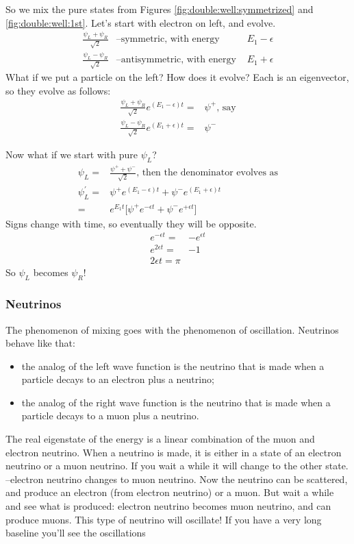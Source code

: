 \documentclass[]{article}
\begin{document}
So we mix the pure states from Figures \ref{fig:double:well:symmetrized} and \ref{fig:double:well:1st}. Let's start with electron on left, and evolve.
\begin{align*}
	\frac{\psi_L+\psi_R}{\sqrt{2}}& \text{--symmetric, with energy }& E_1-\epsilon\\
	\frac{\psi_L-\psi_R}{\sqrt{2}}& \text{--antisymmetric, with energy }& E_1+\epsilon
\end{align*}
What if we put a particle on the left? How does it evolve? Each is an eigenvector, so they evolve as follows:
\begin{align*}
	\frac{\psi_L+\psi_R}{\sqrt{2}} e^{(E_1-\epsilon)t}=&\psi^+ \text{, say}\\
	\frac{\psi_L-\psi_R}{\sqrt{2}}e^{(E_1+\epsilon)t}=&\psi^-
\end{align*}

Now what if we start with pure $\psi_L$?
\begin{align*}
	\psi_L =& \frac{\psi^+ + \psi^-}{\sqrt{2}}\text{, then the denominator evolves as}\\
	\psi_L^\prime =&\psi^+ e^{(E_1-\epsilon)t} + \psi^- e^{(E_1+\epsilon)t}\\
	=&e^{E_1 t}\big[\psi^+ e^{-\epsilon t} + \psi^- e^{+\epsilon t}\big]
\end{align*}
Signs change with time, so eventually they will be opposite.
\begin{align*}
	e^{-\epsilon t} =& - e^{\epsilon t}\\
	e^{2 \epsilon t}=&-1\\
	2 \epsilon t = \pi
\end{align*}
So $\psi_L$ becomes $\psi_R$!

\subsubsection{Neutrinos}

The phenomenon of mixing goes with the phenomenon of oscillation. Neutrinos behave  like that: 
\begin{itemize}
	\item the analog of the left wave function is the neutrino that is made when a particle decays to an electron plus a neutrino;
	\item the analog of the right wave function is the neutrino that is made when a particle decays to a muon plus a neutrino.
\end{itemize}
The real eigenstate of the energy is a linear combination of the muon and electron neutrino. When a neutrino is made, it is either in a state of an electron neutrino or a muon neutrino. If you wait a while it will change to the other state.
--electron neutrino changes to muon neutrino.
Now the neutrino can be scattered, and produce an electron (from electron neutrino) or a muon. But wait a while and see what is produced: electron neutrino becomes muon neutrino, and can produce muons. This type of neutrino will oscillate! If you have a very long baseline you'll see the oscillations
\end{document}
